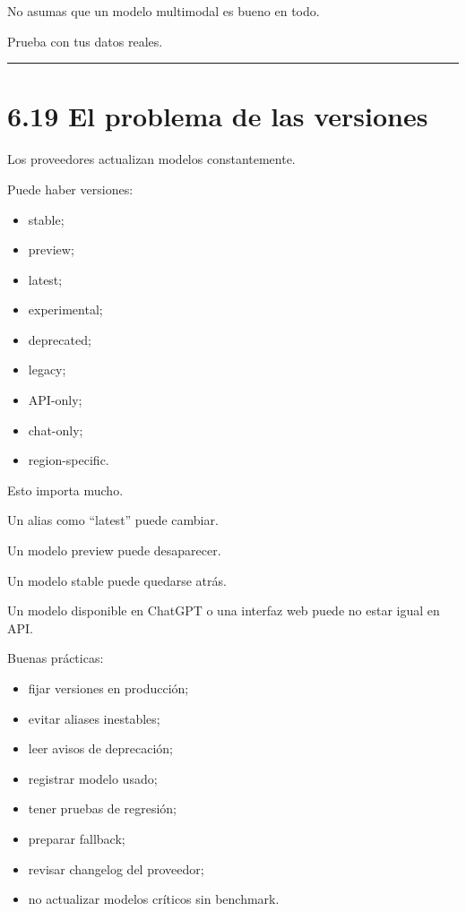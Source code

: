 No asumas que un modelo multimodal es bueno en todo.

Prueba con tus datos reales.

\begin{center}\rule{0.5\linewidth}{0.5pt}\end{center}

\section{6.19 El problema de las
versiones}\label{el-problema-de-las-versiones}

Los proveedores actualizan modelos constantemente.

Puede haber versiones:

\begin{itemize}
\tightlist
\item
  stable;
\item
  preview;
\item
  latest;
\item
  experimental;
\item
  deprecated;
\item
  legacy;
\item
  API-only;
\item
  chat-only;
\item
  region-specific.
\end{itemize}

Esto importa mucho.

Un alias como ``latest'' puede cambiar.

Un modelo preview puede desaparecer.

Un modelo stable puede quedarse atrás.

Un modelo disponible en ChatGPT o una interfaz web puede no estar igual
en API.

Buenas prácticas:

\begin{itemize}
\tightlist
\item
  fijar versiones en producción;
\item
  evitar aliases inestables;
\item
  leer avisos de deprecación;
\item
  registrar modelo usado;
\item
  tener pruebas de regresión;
\item
  preparar fallback;
\item
  revisar changelog del proveedor;
\item
  no actualizar modelos críticos sin benchmark.
\end{itemize}

